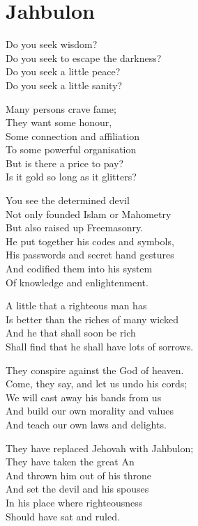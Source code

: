 \documentclass[
]{book}
\begin{document}
\chapter{Jahbulon}\label{jahbulon}

Do you seek wisdom?\\
Do you seek to escape the darkness?\\
Do you seek a little peace?\\
Do you seek a little sanity?

Many persons crave fame;\\
They want some honour,\\
Some connection and affiliation\\
To some powerful organisation\\
But is there a price to pay?\\
Is it gold so long as it glitters?

You see the determined devil\\
Not only founded Islam or Mahometry\\
But also raised up Freemasonry.\\
He put together his codes and symbols,\\
His passwords and secret hand gestures\\
And codified them into his system\\
Of knowledge and enlightenment.

A little that a righteous man has\\
Is better than the riches of many wicked\\
And he that shall soon be rich\\
Shall find that he shall have lots of sorrows.

They conspire against the God of heaven.\\
Come, they say, and let us undo his cords;\\
We will cast away his bands from us\\
And build our own morality and values\\
And teach our own laws and delights.

They have replaced Jehovah with Jahbulon;\\
They have taken the great An\\
And thrown him out of his throne\\
And set the devil and his spouses\\
In his place where righteousness\\
Should have sat and ruled.
\end{document}

